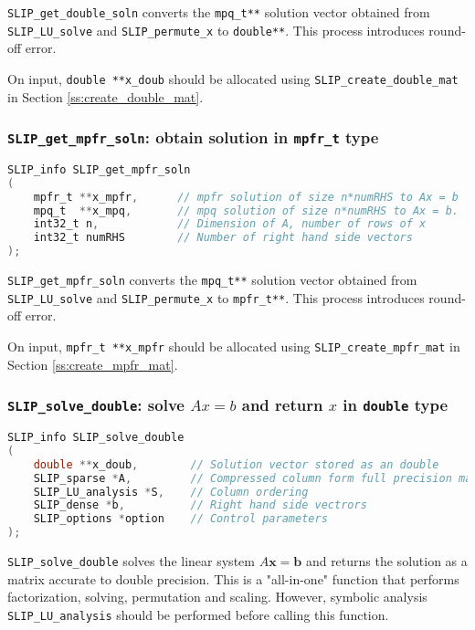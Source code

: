 \documentclass[12pt]{article}
\theoremstyle{definition}
\begin{document}
\verb|SLIP_get_double_soln| converts the \verb|mpq_t**| solution vector obtained from
 \verb|SLIP_LU_solve| and \verb|SLIP_permute_x| to \verb|double**|. This process introduces round-off error.

On input, \verb|double **x_doub| should be allocated using \verb|SLIP_create_double_mat| in Section \ref{ss:create_double_mat}.

\cprotect\subsubsection{\verb|SLIP_get_mpfr_soln|: obtain solution in \verb|mpfr_t| type}\label{ss:get_mpfr_soln}

\begin{lstlisting}[language=C,frame=single]
SLIP_info SLIP_get_mpfr_soln
(
    mpfr_t **x_mpfr,      // mpfr solution of size n*numRHS to Ax = b
    mpq_t  **x_mpq,       // mpq solution of size n*numRHS to Ax = b.
    int32_t n,            // Dimension of A, number of rows of x
    int32_t numRHS        // Number of right hand side vectors
);
\end{lstlisting}

\verb|SLIP_get_mpfr_soln| converts the \verb|mpq_t**| solution vector obtained from
 \verb|SLIP_LU_solve| and \verb|SLIP_permute_x| to \verb|mpfr_t**|. This process introduces round-off error.

On input, \verb|mpfr_t **x_mpfr| should be allocated using \verb|SLIP_create_mpfr_mat| in Section \ref{ss:create_mpfr_mat}.


\cprotect\subsubsection{\verb|SLIP_solve_double|: solve $Ax=b$ and return $x$ in \verb|double| type}\label{ss:SLIP_solve_double}


\begin{lstlisting}[language=C,frame=single]
SLIP_info SLIP_solve_double
(
    double **x_doub,        // Solution vector stored as an double
    SLIP_sparse *A,         // Compressed column form full precision matrix A
    SLIP_LU_analysis *S,    // Column ordering
    SLIP_dense *b,          // Right hand side vectrors
    SLIP_options *option    // Control parameters
);
\end{lstlisting}

\verb|SLIP_solve_double| solves the linear system $A\mathbf{x}=\mathbf{b}$ and returns the solution as a matrix accurate to double precision. This is a "all-in-one" function that performs factorization, solving, permutation and scaling. However, symbolic analysis \verb|SLIP_LU_analysis| should be performed before calling this function.
\end{document}
